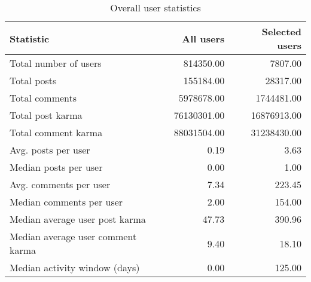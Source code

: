 \begin{table}[H]
\centering
\begin{tabular}{lrr}
\toprule
 Statistic                         &   All users &   Selected users \\
\midrule
 Total number of users             &   814350.00 &          7807.00 \\
 Total posts                       &   155184.00 &         28317.00 \\
 Total comments                    &  5978678.00 &       1744481.00 \\
 Total post karma                  & 76130301.00 &      16876913.00 \\
 Total comment karma               & 88031504.00 &      31238430.00 \\
 Avg. posts per user               &        0.19 &             3.63 \\
 Median posts per user             &        0.00 &             1.00 \\
 Avg. comments per user            &        7.34 &           223.45 \\
 Median comments per user          &        2.00 &           154.00 \\
 Median average user post karma    &       47.73 &           390.96 \\
 Median average user comment karma &        9.40 &            18.10 \\
 Median activity window (days)     &        0.00 &           125.00 \\
\bottomrule
\end{tabular}
\caption{ Overall user statistics }
\vspace{10pt}
\end{table}

